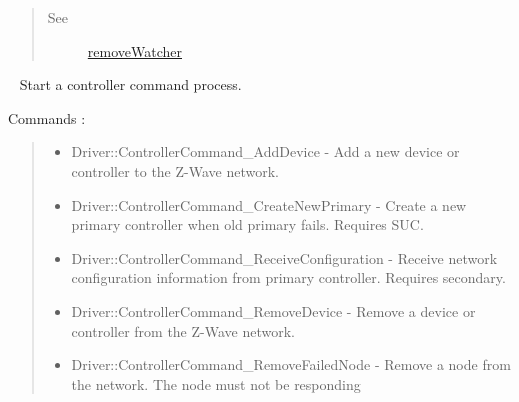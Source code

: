 \documentclass[letterpaper,10pt,english]{sphinxmanual}
\begin{document}
\begin{fulllineitems}
\begin{fulllineitems}
\begin{quote}
\begin{description}
\item[{See}] \leavevmode
{\hyperref[libopenzwave:removewatcher]{removeWatcher}}

\end{description}\end{quote}

\end{fulllineitems}


\begin{fulllineitems}
\label{libopenzwave:libopenzwave.PyManager.beginControllerCommand}~\label{libopenzwave:begincontrollercommand}
Start a controller command process.

Commands :
\begin{quote}
\begin{itemize}
\item {} 
Driver::ControllerCommand\_AddDevice - Add a new device or controller to the Z-Wave network.

\item {} 
Driver::ControllerCommand\_CreateNewPrimary - Create a new primary controller when old primary fails. Requires SUC.

\item {} 
Driver::ControllerCommand\_ReceiveConfiguration - Receive network configuration information from primary controller. Requires secondary.

\item {} 
Driver::ControllerCommand\_RemoveDevice - Remove a device or controller from the Z-Wave network.

\item {} 
Driver::ControllerCommand\_RemoveFailedNode - Remove a node from the network. The node must not be responding

\end{itemize}


\end{quote}
\end{fulllineitems}
\end{fulllineitems}
\end{document}
